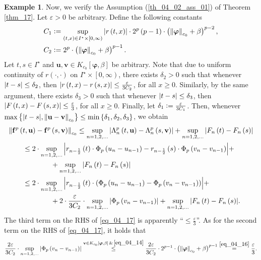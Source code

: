\documentclass[reqno]{amsart}
\numberwithin{equation}{section}
\theoremstyle{definition}
\newtheorem{example}{Example}
\theoremstyle{remark}
\newcommand{\assumptionRef}[1]{\textrm{Assumption (\ref{#1})}}
\newcommand{\ball}[3]{K_{#1}\sbr{#2,#3}}
\newcommand{\br}[1]{\left(#1\right)}
\newcommand{\bu}{\mathbf{u}}
\newcommand{\bv}{\mathbf{v}}
\newcommand{\bvarphi}{\boldsymbol{\varphi}}
\newcommand{\cbr}[1]{\left\{#1\right\}}
\newcommand{\defeq}{\vcentcolon=}
\newcommand{\eps}{\varepsilon}
\newcommand{\eqText}[1]{\stackrel{#1}{=}}
\newcommand{\leqText}[1]{\stackrel{#1}{\leq}}
\newcommand{\lsrbr}[1]{\left[#1\right)}
\newcommand{\sbr}[1]{\left[#1\right]}
\newcommand{\sI}{I^{\star}}
\newcommand{\theoremRef}[1]{\textrm{Theorem \ref{#1}}}
\begin{document}
\begin{example}
		Now, we verify the \assumptionRef{th_04_02_ass_01} of \theoremRef{thm_17}. Let $\eps>0$ be arbitrary. Define the following constants
		\begin{align}
			C_1&\defeq\sup_{\br{t,x}\in\sI\times\lsrbr{0,\infty}}\abs{r\br{t,x}}\cdot2^p\br{p-1}\cdot\br{\norm{\bvarphi}_{c_0}+\beta}^{p-2},\label{eq_04_15}\\
			C_2&\defeq2^p\cdot\br{\norm{\bvarphi}_{c_0}+\beta}^{p-1}.\label{eq_04_16}
		\end{align}
		Let $t,s\in\sI$ and $\bu,\bv\in\ball{c_0}{\bvarphi}{\beta}$ be arbitrary. Note that due to uniform continuity of $r\br{\cdot,\cdot}$ on $\sI\times\lsrbr{0,\infty}$, there exists $\delta_2>0$ such that whenever $\abs{t-s}\leq\delta_2$, then $\abs{r\br{t,x}-r\br{s,x}}\leq\frac{\eps}{3C_2}$, for all $x\geq0$. Similarly, by the same argument, there exists $\delta_3>0$ such that whenever $\abs{t-s}\leq\delta_3$, then $\abs{F\br{t,x}-F\br{s,x}}\leq\frac{\eps}{3}$, for all $x\geq0$. Finally, let $\delta_1\defeq\frac{\eps}{3C_1}$. Then, whenever $\max\cbr{\abs{t-s},\norm{\bu-\bv}_{c_0}}\leq\min\cbr{\delta_1,\delta_2,\delta_3}$, we obtain
		\begin{equation}\label{eq_04_17}
			\begin{aligned}
				&\norm{\mathbf{f}^p\br{t,\bu}-\mathbf{f}^p\br{s,\bv}}_{c_0}\leq\sup_{n=1,2,\dots}\abs{\Lambda^p_n\br{t,\bu}-\Lambda^p_n\br{s,\bv}}+\sup_{n=1,2,\dots}\abs{F_n\br{t}-F_n\br{s}}\\
				&\qquad\leq2\cdot\sup_{n=1,2,\dots}\abs{r_{n-\frac{1}{2}}\br{t}\cdot\Phi_p\br{u_n-u_{n-1}}-r_{n-\frac{1}{2}}\br{s}\cdot\Phi_p\br{v_n-v_{n-1}}}+\\
				&\qquad\qquad\qquad+\sup_{n=1,2,\dots}\abs{F_n\br{t}-F_n\br{s}}\\
				&\qquad\leq2\cdot\sup_{n=1,2,\dots}\abs{r_{n-\frac{1}{2}}\br{t}\cdot\br{\Phi_p\br{u_n-u_{n-1}}-\Phi_p\br{v_n-v_{n-1}}}}+\\
				&\qquad\qquad\qquad+2\cdot\frac{\eps}{3C_2}\cdot\sup_{n=1,2,\dots}\abs{\Phi_p\br{v_{n}-v_{n-1}}}+\sup_{n=1,2,\dots}\abs{F_n\br{t}-F_n\br{s}}.
			\end{aligned}
		\end{equation}
		The third term on the RHS of \eqref{eq_04_17} is apparently \enquote{$\leq\frac{\eps}{3}$}. As for the second term on the RHS of \eqref{eq_04_17}, it holds that
		\begin{equation*}
			\frac{2\eps}{3C_2}\cdot\sup_{n=1,2,\dots}\abs{\Phi_p\br{v_{n}-v_{n-1}}}\leqText{\bv\in\ball{c_0}{\bvarphi}{\beta}\,\&\,\eqref{eq_04_14}}\frac{2\eps}{3C_2}\cdot2^{p-1}\cdot\br{\norm{\bvarphi}_{c_0}+\beta}^{p-1}\eqText{\eqref{eq_04_16}}\frac{\eps}{3}.

\end{equation*}
\end{example}
\end{document}
